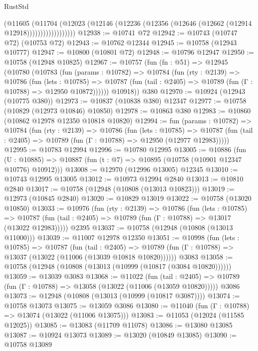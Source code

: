 \begin{lexlean}{RustStd}
\begin{coremodule}
                      (@11605
                        (@11704
                          (@12023
                            (@12146 (@12236 (@12356 (@12646 (@12662 (@12914 @12918))))))))))))))))))
@12938 := @10741 @72
@12942 := @10743 (@10747 @72) (@10753 @72)
@12943 := @10762 @12344
@12945 := @10758 (@12943 @10777)
@12947 := @10800 (@10801 @72)
@12948 := @10796 @12947
@12950 := @10758 (@12948 @10825)
@12967 := @10757
    (fun (fn : @51) =>
    @12945
      (@10780
        (@10783
          (fun (params : @10782) =>
          @10784
            (fun (rty : @2139) =>
            @10786
              (fun (lets : @10785) =>
              @10787 (fun (tail : @2405) => @10789 (fun (Γ : @10788) => @12950 @10872))))))
        @10918))
    @380
@12970 := @10924 (@12943 (@10775 @380))
@12973 := @10837 (@10838 @380) @12347
@12977 := @10758 (@10829 (@12973 @10846) @10850)
@12978 := @10863 @380
@12983 := @10860 (@10862 @12978 @12350 @10818 @10820)
@12994 := fun (params : @10782) =>
  @10784
    (fun (rty : @2139) =>
    @10786
      (fun (lets : @10785) =>
      @10787 (fun (tail : @2405) => @10789 (fun (Γ : @10788) => @12950 (@12977 @12983)))))
@12995 := @10783 @12994
@12996 := @10780 @12995
@13005 := @10886
    (fun (U : @10885) => @10887 (fun (t : @7) => @10895 (@10758 (@10901 @12347 @10776) @10912)))
@13008 := @12970 (@12996 @13005) @12345
@13010 := @10743 @12995 @13005
@13012 := @10973 @12994 @2840
@13013 := @10810 @2840
@13017 := @10758 (@12948 (@10808 (@13013 @10823)))
@13019 := @12973 (@10845 @2840)
@13020 := @10829 @13019
@13022 := @10758 (@13020 @10850)
@13033 := @10976
    (fun (rty : @2139) =>
    @10786
      (fun (lets : @10785) =>
      @10787 (fun (tail : @2405) => @10789 (fun (Γ : @10788) => @13017 (@13022 @12983)))))
    @2395
@13037 := @10758 (@12948 (@10808 (@13013 @11000)))
@13039 := @11007 @12978 @12350
@13051 := @10998
    (fun (lets : @10785) =>
    @10787
      (fun (tail : @2405) =>
      @10789 (fun (Γ : @10788) => @13037 (@13022 (@11006 (@13039 @10818 @10820))))))
    @3083
@13058 := @10758 (@12948 (@10808 (@13013 (@10999 (@10817 (@3084 @10820))))))
@13059 := @13039 @3083
@13068 := @11022
    (fun (tail : @2405) => @10789 (fun (Γ : @10788) => @13058 (@13022 (@11006 (@13059 @10820)))))
    @3086
@13073 := @12948 (@10808 (@13013 (@10999 (@10817 @3087))))
@13074 := @10758 @13073
@13075 := @13059 @3086
@13080 := @11040 (fun (Γ : @10788) => @13074 (@13022 (@11006 @13075)))
@13083 := @11053 (@12024 (@11585 @12025))
@13085 := @13083 (@11709 @11078)
@13086 := @13080 @13085
@13087 := @10924 @13073
@13089 := @13020 (@10849 @13085)
@13090 := @10758 @13089

\end{coremodule}
\end{lexlean}
